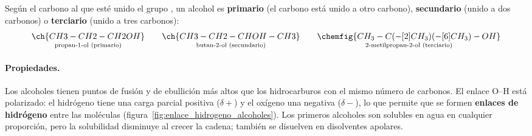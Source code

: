 Según el carbono al que esté unido el grupo , un alcohol es \textbf{primario} (el carbono está unido a otro carbono), \textbf{secundario} (unido a dos carbonos) o \textbf{terciario} (unido a tres carbonos):
\[ \underset{\text{propan-1-ol (primario)}}{\ch{CH3-CH2-CH2OH}} \qquad \underset{\text{butan-2-ol (secundario)}}{\ch{CH3-CH2-CHOH-CH3}} \qquad \underset{\text{2-metilpropan-2-ol (terciario)}}{\chemfig{CH_3-C(-[2]CH_3)(-[6]CH_3)-OH}} \]

\paragraph{Propiedades.} Los alcoholes tienen puntos de fusión y de ebullición más altos que los hidrocarburos con el mismo número de carbonos. El enlace O--H está polarizado: el hidrógeno tiene una carga parcial positiva (\(\delta+\)) y el oxígeno una negativa (\(\delta-\)), lo que permite que se formen \textbf{enlaces de hidrógeno} entre las moléculas (figura~\ref{fig:enlace_hidrogeno_alcoholes}). Los primeros alcoholes son solubles en agua en cualquier proporción, pero la solubilidad disminuye al crecer la cadena; también se disuelven en disolventes apolares.


